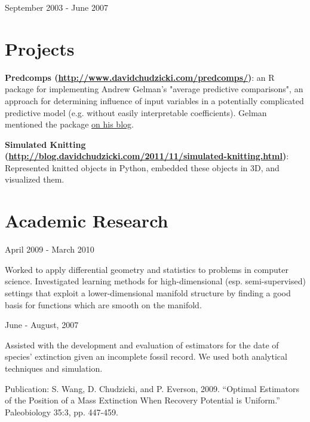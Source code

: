 \documentclass[letterpaper]{resume}
\begin{document}
{September 2003 - June 2007}
{}
{}

\section{Projects}
\begin{compactitem}
\item \textbf{Predcomps (\href{http://www.davidchudzicki.com/predcomps/}{http://www.davidchudzicki.com/predcomps/})}: an R package for implementing Andrew Gelman's "average predictive comparisons", an approach for determining influence of input variables in a potentially complicated predictive model (e.g. without easily interpretable coefficients). Gelman mentioned the package \href{http://andrewgelman.com/2014/06/17/average-predictive-comparisons-r-david-chudzicki-writes-package/}{\underline{on his blog}}.
\end{compactitem}

\begin{compactitem}
\item \textbf{Simulated Knitting (\href{http://blog.davidchudzicki.com/2011/11/simulated-knitting.html}{http://blog.davidchudzicki.com/2011/11/simulated-knitting.html})}: Represented knitted objects in Python, embedded these objects in 3D, and visualized them.
\end{compactitem}

\section{Academic Research}

{April 2009 - March 2010}
{}
{}
\begin{compactitem}
\item Worked to apply differential geometry and 
statistics to problems in computer science. Investigated learning methods for 
high-dimensional (esp. semi-supervised) settings that exploit a lower-dimensional manifold structure by finding a good 
basis for functions which are smooth on the manifold.
\end{compactitem}

{June - August, 2007}
{}
{}
\begin{compactitem}
\item Assisted with the development and evaluation of estimators for the
date of species' extinction given an incomplete fossil record. We used
both analytical techniques and simulation.

\begin{compactitem}

\item Publication: S. Wang, D. Chudzicki, and P. Everson, 2009. ``Optimal Estimators of the Position of a Mass Extinction When Recovery Potential is Uniform.'' Paleobiology 35:3, pp. 447-459. 

\end{compactitem}

\end{compactitem}
\end{document}
